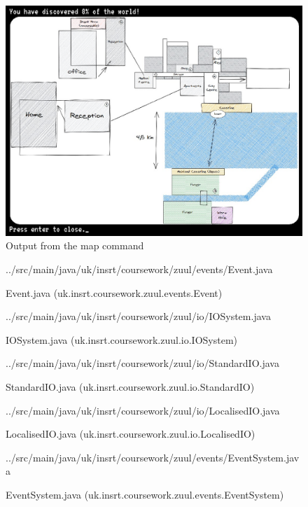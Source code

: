 \documentclass{article}
\begin{document}
    \begin{figure}
        \centering
        \includegraphics[width=\textwidth]{images/map-ingame.jpg}
        \caption{Output from the map command} \label{fig:map-ingame}
    \end{figure}
    \begin{figure}
        
        {../src/main/java/uk/insrt/coursework/zuul/events/Event.java}
        \caption{Event.java (uk.insrt.coursework.zuul.events.Event)} \label{fig:event}
    \end{figure}
    \begin{figure}
        
        {../src/main/java/uk/insrt/coursework/zuul/io/IOSystem.java}
        \caption{IOSystem.java (uk.insrt.coursework.zuul.io.IOSystem)} \label{fig:io-system}
    \end{figure}
    \begin{figure}
        
        {../src/main/java/uk/insrt/coursework/zuul/io/StandardIO.java}
        \caption{StandardIO.java (uk.insrt.coursework.zuul.io.StandardIO)} \label{fig:standard-io}
    \end{figure}
    \begin{figure}
        
        {../src/main/java/uk/insrt/coursework/zuul/io/LocalisedIO.java}
        \caption{LocalisedIO.java (uk.insrt.coursework.zuul.io.LocalisedIO)} \label{fig:localised-io}
    \end{figure}
    \begin{figure}
        
        {../src/main/java/uk/insrt/coursework/zuul/events/EventSystem.java}
        \caption{EventSystem.java (uk.insrt.coursework.zuul.events.EventSystem)} \label{fig:event-system}
    \end{figure}
\end{document}
